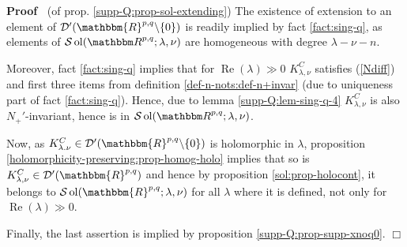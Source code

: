\documentclass{article}
\newcommand{\tmop}[1]{\ensuremath{\operatorname{#1}}}
\newenvironment{proof}{\noindent\textbf{Proof\ }}{\hspace*{\fill}$\Box$\medskip}
\numberwithin{definition}{section}
\numberwithin{lemma}{section}
\numberwithin{proposition}{section}
{\theorembodyfont{\rmfamily}\newtheorem{remark}{Remark}
\numberwithin{remark}{section}
}
\begin{document}
\begin{proof}
  (of prop. \ref{supp-Q:prop-sol-extending}) The existence of extension to an
  element of $\mathcal{D}' ( \mathbbm{R}^{p, q} \backslash \{ 0 \})$ is
  readily implied by fact \ref{fact:sing-q}, as elements of $\mathcal{S}
  \tmop{ol} ( \R^{p, q} ; \lambda, \nu)$ are homogeneous with degree $\lambda
  - \nu - n$.
  
  Moreover, fact \ref{fact:sing-q} implies that for $\tmop{Re} ( \lambda) \gg
  0$ $K_{\lambda, \nu}^C$ satisfies (\ref{Ndiff}) and first three items from
  definition \ref{def-n-nots:def-n+invar} (due to uniqueness part of fact
  \ref{fact:sing-q}). Hence, due to lemma \ref{supp-Q:lem-sing-q-4}
  $K_{\lambda, \nu}^C$ is also $N_+'$-invariant, hence is in $\mathcal{S}
  \tmop{ol} ( \R^{p, q} ; \lambda, \nu)$.
  
  Now, as $K_{\lambda . \nu}^C \in \mathcal{D}' ( \mathbbm{R}^{p, q}
  \backslash \{ 0 \})$ is holomorphic in $\lambda$, proposition
  \ref{holomorphicity-preserving:prop-homog-holo} implies that so is
  $K_{\lambda, \nu}^C \in \mathcal{D}' ( \mathbbm{R}^{p, q})$ and hence by
  proposition \ref{sol:prop-holocont}, it belongs to $\mathcal{S} \tmop{ol} (
  \mathbbm{R}^{p, q} ; \lambda, \nu)$ for all $\lambda$ where it is defined,
  not only for $\tmop{Re} ( \lambda) \gg 0$.
  
  Finally, the last assertion is implied by proposition
  \ref{supp-Q:prop-supp-xnoq0}.
\end{proof}
\end{document}
